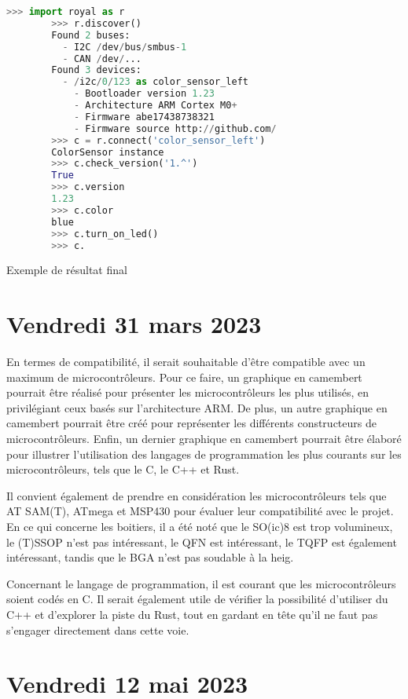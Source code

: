 \begin{listing}[!h]
    \begin{lstlisting}[language=python]
        >>> import royal as r
        >>> r.discover()
        Found 2 buses: 
          - I2C /dev/bus/smbus-1
          - CAN /dev/...
        Found 3 devices:
          - /i2c/0/123 as color_sensor_left
            - Bootloader version 1.23
            - Architecture ARM Cortex M0+ 
            - Firmware abe17438738321
            - Firmware source http://github.com/
        >>> c = r.connect('color_sensor_left')
        ColorSensor instance
        >>> c.check_version('1.^')
        True
        >>> c.version
        1.23
        >>> c.color
        blue
        >>> c.turn_on_led()
        >>> c.
    \end{lstlisting}
    \caption{Exemple de résultat final}
\end{listing}

\section{Vendredi 31 mars 2023}

En termes de compatibilité, il serait souhaitable d'être compatible avec un maximum de microcontrôleurs.
Pour ce faire, un graphique en camembert pourrait être réalisé pour présenter les microcontrôleurs les plus utilisés, en privilégiant ceux basés sur l'architecture ARM.
De plus, un autre graphique en camembert pourrait être créé pour représenter les différents constructeurs de microcontrôleurs.
Enfin, un dernier graphique en camembert pourrait être élaboré pour illustrer l'utilisation des langages de programmation les plus courants sur les microcontrôleurs, tels que le C, le C++ et Rust.

Il convient également de prendre en considération les microcontrôleurs tels que AT SAM(T), ATmega et MSP430 pour évaluer leur compatibilité avec le projet.
En ce qui concerne les boitiers, il a été noté que le SO(ic)8 est trop volumineux, le (T)SSOP n'est pas intéressant, le QFN est intéressant, le TQFP est également intéressant, tandis que le BGA n'est pas soudable à la \gls{heig}.

Concernant le langage de programmation, il est courant que les microcontrôleurs soient codés en C.
Il serait également utile de vérifier la possibilité d'utiliser du C++ et d'explorer la piste du Rust, tout en gardant en tête qu'il ne faut pas s'engager directement dans cette voie.

\section{Vendredi 12 mai 2023}

